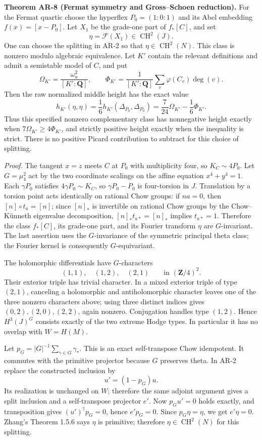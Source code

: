 \textbf{Theorem AR-8 (Fermat symmetry and Gross--Schoen reduction).} For
the Fermat quartic choose the hyperflex \(P_0=(1:0:1)\) and its Abel
embedding \(f(x)=[x-P_0]\). Let \(X_1\) be the grade-one part of
\(f_*[C]\), and set \[
\eta=\mathcal F(X_1)\in\operatorname{CH}^2(J).
\] One can choose the splitting in AR-2 so that
\(\eta\in\operatorname{CH}^2(N)\). This class is nonzero modulo
algebraic equivalence. Let \(K'\) contain the relevant definitions and
admit a semistable model of \(C\), and put \[
\Omega_{K'}=\frac{\omega_a^2}{[K':\mathbf Q]},
\qquad
\Phi_{K'}=\frac{1}{[K':\mathbf Q]}
 \sum_v\varphi(C_v)\deg(v).
\] Then the raw normalized middle height has the exact value \[
h_{K'}(\eta,\eta)
 =\frac16 h_{K'}(\Delta_{P_0},\Delta_{P_0})
 =\frac7{24}\Omega_{K'}-\frac16\Phi_{K'}.
\tag{AR.10}
\] Thus this specified nonzero complementary class has nonnegative
height exactly when \(7\Omega_{K'}\ge4\Phi_{K'}\), and strictly positive
height exactly when the inequality is strict. There is no positive
Picard contribution to subtract for this choice of splitting.

\emph{Proof.} The tangent \(x=z\) meets \(C\) at \(P_0\) with
multiplicity four, so \(K_C\sim4P_0\). Let \(G=\mu_4^2\) act by the two
coordinate scalings on the affine equation \(x^4+y^4=1\). Each
\(\gamma P_0\) satisfies \(4\gamma P_0\sim K_C\), so \(\gamma P_0-P_0\)
is four-torsion in \(J\). Translation by a torsion point acts
identically on rational Chow groups: if \(na=0\), then
\([n]\circ t_a=[n]\); since \([n]_*\) is invertible on rational Chow
groups by the Chow--Künneth eigenvalue decomposition,
\([n]_*t_{a*}=[n]_*\) implies \(t_{a*}=1\). Therefore the class
\(f_*[C]\), its grade-one part, and its Fourier transform \(\eta\) are
\(G\)-invariant. The last assertion uses the \(G\)-invariance of the
symmetric principal theta class; the Fourier kernel is consequently
\(G\)-equivariant.

The holomorphic differentials have \(G\)-characters \[
(1,1),\quad(1,2),\quad(2,1)\qquad\text{in }(\mathbf Z/4)^2.
\] Their exterior triple has trivial character. In a mixed exterior
triple of type \((2,1)\), canceling a holomorphic and antiholomorphic
character leaves one of the three nonzero characters above; using three
distinct indices gives \((0,2),(2,0),(2,2)\), again nonzero. Conjugation
handles type \((1,2)\). Hence \(H^3(J)^G\) consists exactly of the two
extreme Hodge types. In particular it has no overlap with \(W=H(M)\).

Let \(p_G=|G|^{-1}\sum_{\gamma\in G}\gamma_*\). This is an exact
self-transpose Chow idempotent. It commutes with the primitive projector
because \(G\) preserves theta. In AR-2 replace the constructed inclusion
by \[
u'=(1-p_G)u.
\] Its realization is unchanged on \(W\); therefore the same adjoint
argument gives a split inclusion and a self-transpose projector \(e'\).
Now \(p_Gu'=0\) holds exactly, and transposition gives
\((u')^\dagger p_G=0\), hence \(e'p_G=0\). Since \(p_G\eta=\eta\), we
get \(e'\eta=0\). Zhang's Theorem 1.5.6 says \(\eta\) is primitive;
therefore \(\eta\in\operatorname{CH}^2(N)\) for this splitting.

